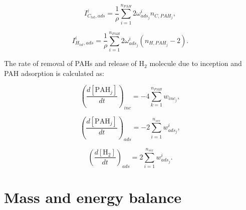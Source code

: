 \begin{equation}
	I^i_{C_{tot},ads} =
	\frac{1}{\rho}
	\sum_{i=1}^{n_{PAH}}
	2\omega^i_{ads_j}
	n_{C,PAH_j}
	\label{eqn:ICtotads_dimcoal},
\end{equation}

\begin{equation}
	I^i_{H_{tot},ads} =
	\frac{1}{\rho}
	\sum_{i=1}^{n_{PAH}}
	2\omega^i_{ads_j}
	\left(n_{H,PAH_j}-2\right)
	\label{eqn:IHtotads_dimcoal}.
\end{equation}

The rate of removal of PAHs and release of $\mathrm{H_2}$ molecule due to inception and PAH adsorption is calculated as:

\begin{equation}
	\left(
	\frac{d\left[{\mathrm{PAH}_j}\right]}{dt}
	\right)_{inc}
	= 
	-4\sum_{k=1}^{n_{PAH}}w_{inc_{j}},
	\label{eqn:PAHscrub_dimcoal_inc}
\end{equation}

\begin{equation}
	\left(
	\frac{d\left[{\mathrm{PAH}_j}\right]}{dt}
	\right)_{ads}
	= 
	-2\sum_{i=1}^{n_{sec}}w^i_{ads_j},
	\label{eqn:PAHscrub_dimcoal_ads}
\end{equation}

\begin{equation}
	\left(
	\frac{d\left[{\mathrm{H_2}}\right]}{dt}
	\right)_{ads}
	= 
	2\sum_{i=1}^{n_{sec}}w^i_{ads_j}
	\label{eqn:H2scrub_dimcoal}.
\end{equation}


\section{Mass and energy balance}

